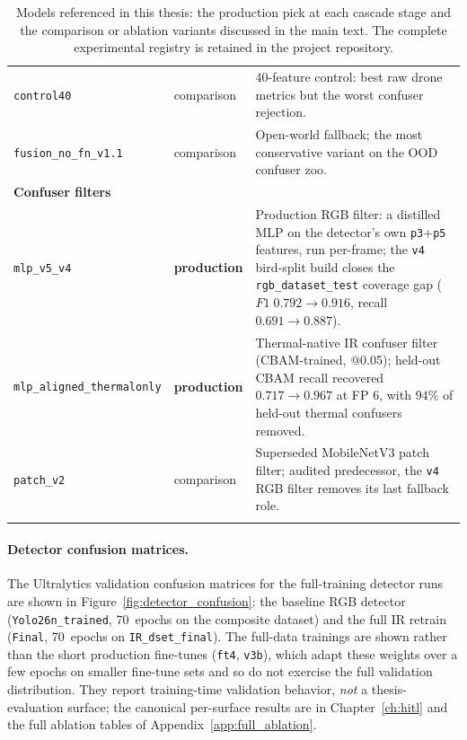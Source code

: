\begin{longtable}{p{}lp{}}
\texttt{control40} & comparison & 40-feature control: best raw drone metrics but the worst confuser rejection. \\
\texttt{fusion\_no\_fn\_v1.1} & comparison & Open-world fallback; the most conservative variant on the OOD confuser zoo. \\
\midrule
\multicolumn{3}{l}{\textbf{Confuser filters}} \\
\midrule
\texttt{mlp\_v5\_v4} & \textbf{production} & Production RGB filter: a distilled MLP on the detector's own \texttt{p3}+\texttt{p5} features, run per-frame; the \texttt{v4} bird-split build closes the \texttt{rgb\_dataset\_test} coverage gap ($F1\;0.792\to0.916$, recall $0.691\to0.887$). \\
\texttt{mlp\_aligned\_thermalonly} & \textbf{production} & Thermal-native IR confuser filter (CBAM-trained, @0.05); held-out CBAM recall recovered $0.717\to0.967$ at FP $6$, with $94\%$ of held-out thermal confusers removed. \\
\texttt{patch\_v2} & comparison & Superseded MobileNetV3 patch filter; audited predecessor, the \texttt{v4} RGB filter removes its last fallback role. \\
\bottomrule
\caption{Models referenced in this thesis: the production pick at each cascade stage and the comparison or ablation variants discussed in the main text. The complete experimental registry is retained in the project repository.}
\label{tab:models_evaluated}
\end{longtable}
\normalsize


\paragraph{Detector confusion matrices.}
The Ultralytics validation confusion matrices for the full-training detector runs are shown in Figure~\ref{fig:detector_confusion}: the baseline RGB detector (\texttt{Yolo26n\_trained}, 70~epochs on the composite dataset) and the full IR retrain (\texttt{Final}, 70~epochs on \texttt{IR\_dset\_final}). The full-data trainings are shown rather than the short production fine-tunes (\texttt{ft4}, \texttt{v3b}), which adapt these weights over a few epochs on smaller fine-tune sets and so do not exercise the full validation distribution. They report training-time validation behavior, \emph{not} a thesis-evaluation surface; the canonical per-surface results are in Chapter~\ref{ch:hitl} and the full ablation tables of Appendix~\ref{app:full_ablation}.

